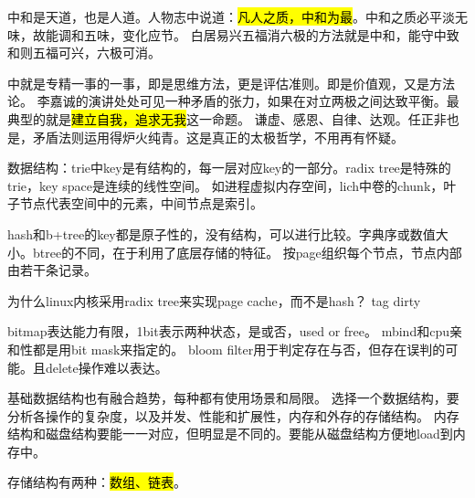 中和是天道，也是人道。人物志中说道：\hl{凡人之质，中和为最}。中和之质必平淡无味，故能调和五味，变化应节。
白居易兴五福消六极的方法就是中和，能守中致和则五福可兴，六极可消。

中就是专精一事的一事，即是思维方法，更是评估准则。即是价值观，又是方法论。
李嘉诚的演讲处处可见一种矛盾的张力，如果在对立两极之间达致平衡。最典型的就是\hl{建立自我，追求无我}这一命题。
谦虚、感恩、自律、达观。任正非也是，矛盾法则运用得炉火纯青。这是真正的太极哲学，不用再有怀疑。

数据结构：trie中key是有结构的，每一层对应key的一部分。radix tree是特殊的trie，key space是连续的线性空间。
如进程虚拟内存空间，lich中卷的chunk，叶子节点代表空间中的元素，中间节点是索引。

hash和b+tree的key都是原子性的，没有结构，可以进行比较。字典序或数值大小。btree的不同，在于利用了底层存储的特征。
按page组织每个节点，节点内部由若干条记录。

为什么linux内核采用radix tree来实现page cache，而不是hash？
tag dirty

bitmap表达能力有限，1bit表示两种状态，是或否，used or free。
mbind和cpu亲和性都是用bit mask来指定的。
bloom filter用于判定存在与否，但存在误判的可能。且delete操作难以表达。

基础数据结构也有融合趋势，每种都有使用场景和局限。
选择一个数据结构，要分析各操作的复杂度，以及并发、性能和扩展性，内存和外存的存储结构。
内存结构和磁盘结构要能一一对应，但明显是不同的。要能从磁盘结构方便地load到内存中。

存储结构有两种：\hl{数组、链表}。
